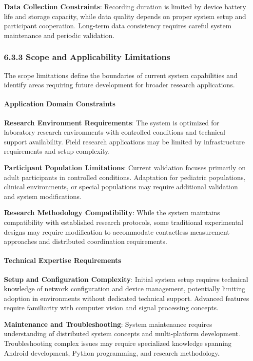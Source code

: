 \documentclass[12pt,a4paper]{article}
\begin{document}
\textbf{Data Collection Constraints}: Recording duration is limited by device battery life and storage capacity, while data
quality depends on proper system setup and participant cooperation. Long-term data consistency requires careful system
maintenance and periodic validation.

\subsubsection{6.3.3 Scope and Applicability Limitations}

The scope limitations define the boundaries of current system capabilities and identify areas requiring future
development for broader research applications.

\paragraph{Application Domain Constraints}

\textbf{Research Environment Requirements}: The system is optimized for laboratory research environments with controlled
conditions and technical support availability. Field research applications may be limited by infrastructure requirements
and setup complexity.

\textbf{Participant Population Limitations}: Current validation focuses primarily on adult participants in controlled
conditions. Adaptation for pediatric populations, clinical environments, or special populations may require additional
validation and system modifications.

\textbf{Research Methodology Compatibility}: While the system maintains compatibility with established research protocols,
some traditional experimental designs may require modification to accommodate contactless measurement approaches and
distributed coordination requirements.

\paragraph{Technical Expertise Requirements}

\textbf{Setup and Configuration Complexity}: Initial system setup requires technical knowledge of network configuration and
device management, potentially limiting adoption in environments without dedicated technical support. Advanced features
require familiarity with computer vision and signal processing concepts.

\textbf{Maintenance and Troubleshooting}: System maintenance requires understanding of distributed system concepts and
multi-platform development. Troubleshooting complex issues may require specialized knowledge spanning Android
development, Python programming, and research methodology.
\end{document}
